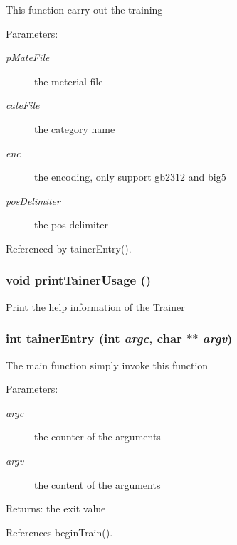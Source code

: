 This function carry out the training

\begin{Desc}
\item[Parameters:]
\begin{description}
\item[{\em pMateFile}]the meterial file \item[{\em cateFile}]the category name \item[{\em enc}]the encoding, only support gb2312 and big5 \item[{\em posDelimiter}]the pos delimiter \end{description}
\end{Desc}


Referenced by tainerEntry().
\subsubsection{\setlength{\rightskip}{0pt plus 5cm}void printTainerUsage ()}\label{TrainerCMD_8h_cadfbf3ad2e202a3d175a59bac8079a1}


Print the help information of the Trainer 
\subsubsection{\setlength{\rightskip}{0pt plus 5cm}int tainerEntry (int {\em argc}, \/  char $\ast$$\ast$ {\em argv})}\label{TrainerCMD_8h_16127519ffec951fcf4cf053c2a573a5}


The main function simply invoke this function

\begin{Desc}
\item[Parameters:]
\begin{description}
\item[{\em argc}]the counter of the arguments \item[{\em argv}]the content of the arguments \end{description}
\end{Desc}
\begin{Desc}
\item[Returns:]the exit value \end{Desc}


References beginTrain().